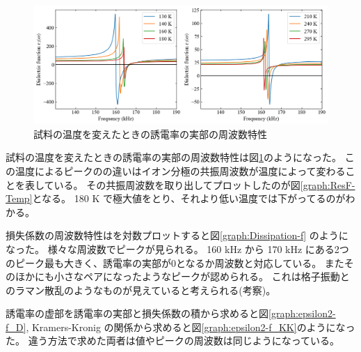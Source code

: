 \documentclass[9pt,dvipdfmx,a4paper]{jsarticle}
\begin{document}
\begin{figure}[t]
    \includegraphics[width=0.96\columnwidth]{epsilon1-f.png}
    \caption{試料の温度を変えたときの誘電率の実部の周波数特性}
    \label{graph:epsilon1-f}
\end{figure}


試料の温度を変えたときの誘電率の実部の周波数特性は図\ref{graph:epsilon1-f}のようになった。
この温度によるピークのの違いはイオン分極の共振周波数が温度によって変わることを表している。
その共振周波数を取り出してプロットしたのが図\ref{graph:ResF-Temp}となる。
180 K で極大値をとり、それより低い温度では下がってるのがわかる。

損失係数の周波数特性はを対数プロットすると図\ref{graph:Dissipation-f} のようになった。
様々な周波数でピークが見られる。
160 kHz から 170 kHz にある2つのピーク最も大きく、誘電率の実部が0となるか周波数と対応している。
またそのほかにも小さなペアになったようなピークが認められる。
これは格子振動とのラマン散乱のようなものが見えていると考えられる(考察)。

誘電率の虚部を誘電率の実部と損失係数の積から求めると図\ref{graph:epsilon2-f_D},
Kramers-Kronig の関係から求めると図\ref{graph:epsilon2-f_KK}のようになった。
違う方法で求めた両者は値やピークの周波数は同じようになっている。
\end{document}
